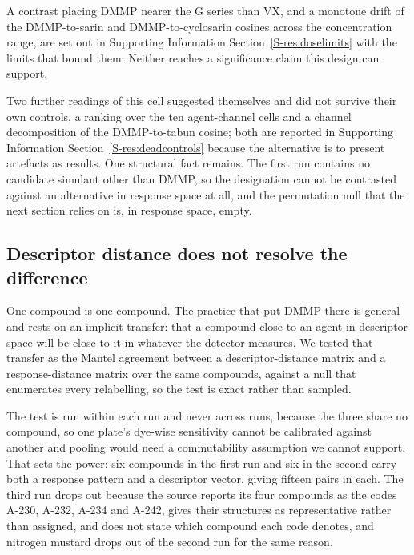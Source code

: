 \documentclass[journal=jacsat,manuscript=article,margin=1in]{achemso}
\begin{document}
A contrast placing DMMP nearer the G series than VX, and a monotone drift of
the DMMP-to-sarin and DMMP-to-cyclosarin cosines across the concentration
range, are set out in Supporting Information
Section~\ref{S-res:doselimits} with the limits that bound them. Neither
reaches a significance claim this design can support.

Two further readings of this cell suggested themselves and did not survive
their own controls, a ranking over the ten agent-channel cells and a channel
decomposition of the DMMP-to-tabun cosine; both are reported in Supporting
Information Section~\ref{S-res:deadcontrols} because the alternative is to
present artefacts as results. One structural fact remains. The first run
contains no candidate simulant other than DMMP, so the designation cannot be
contrasted against an alternative in response space at all, and the
permutation null that the next section relies on is, in response space,
empty.

\subsection{Descriptor distance does not resolve the difference}
\label{res:mantel}

One compound is one compound. The practice that put DMMP there is general and
rests on an implicit transfer: that a compound close to an agent in descriptor
space will be close to it in whatever the detector measures. We tested that
transfer as the Mantel agreement between a descriptor-distance matrix and a
response-distance matrix over the same compounds, against a null that
enumerates every relabelling, so the test is exact rather than sampled.

The test is run within each run and never across runs, because the three share
no compound, so one plate's dye-wise sensitivity cannot be calibrated against
another and pooling would need a commutability assumption we cannot support.
That sets the power: six compounds in the first run
and six in the second carry both a response pattern and a descriptor vector,
giving fifteen pairs in each. The third run drops out because the source reports
its four compounds as the codes A-230, A-232, A-234 and A-242, gives their
structures as representative rather than assigned, and does not state which
compound each code denotes,\cite{group3ref} and nitrogen mustard drops out of
the second run for the same reason.
\end{document}
